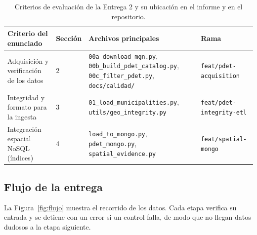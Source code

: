 \documentclass[12pt, letterpaper]{article}
\begin{document}
\begin{table}[H]
\centering
\small
{}
\begin{tabularx}{\textwidth}{Y{0.25} Y{0.14} Y{0.38} Y{0.23}}
\toprule
\textbf{Criterio del enunciado} & \textbf{Sección} & \textbf{Archivos principales} & \textbf{Rama} \\
\midrule
Adquisición y verificación de los datos & 2 & \texttt{00a\_download\_mgn.py}, \texttt{00b\_build\_pdet\_catalog.py}, \texttt{00c\_filter\_pdet.py}, \texttt{docs/calidad/} & \texttt{feat/pdet-acquisition} \\
Integridad y formato para la ingesta & 3 & \texttt{01\_load\_municipalities.py}, \texttt{utils/geo\_integrity.py} & \texttt{feat/pdet-integrity-etl} \\
Integración espacial NoSQL (índices) & 4 & \texttt{load\_to\_mongo.py}, \texttt{pdet\_mongo.py}, \texttt{spatial\_evidence.py} & \texttt{feat/spatial-mongo} \\
\bottomrule
\end{tabularx}
\caption{Criterios de evaluación de la Entrega 2 y su ubicación en el informe y en el repositorio.}
\label{tab:criterios}
\end{table}

\subsection{Flujo de la entrega}
La Figura~\ref{fig:flujo} muestra el recorrido de los datos. Cada etapa verifica su entrada y se detiene con un error si un control falla, de modo que no llegan datos dudosos a la etapa siguiente.
\end{document}
